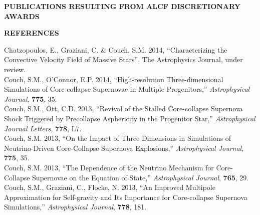 \documentclass[12pt,letterpaper,english]{article}
\begin{document}
\setlength{\parindent}{0in} %


\pagestyle{fancy} \lhead{\doctitle}  \renewcommand{%
\headrulewidth}{0.0pt}

\begin{center}
\bf \large {PUBLICATIONS RESULTING FROM ALCF DISCRETIONARY AWARDS} \\
\end{center}
\vspace{-.25in}
{\noindent \bf \large {REFERENCES
}}

\leftskip 0.25in
 \parindent -0.25in
Chatzopoulos, E., Graziani, C. \& Couch, S.M. 2014, ``Characterizing the Convective Velocity
Field of Massive Stars'', The Astrophysics Journal, under review. \\
 Couch, S.M., O'Connor, E.P. 2014, ``High-resolution Three-dimensional Simulations of Core-collapse Supernovae in Multiple Progenitors,''
  {\it Astrophysical Journal}, {\bf 775}, 35. \\
 Couch, S.M., Ott, C.D. 2013, ``Revival of the Stalled Core-collapse Supernova Shock Triggered by Precollapse Asphericity in the Progenitor Star,''
  {\it Astrophysical Journal Letters}, {\bf 778}, L7. \\
 Couch, S.M. 2013, ``On the Impact of Three Dimensions in
  Simulations of Neutrino-Driven Core-Collapse Supernova Explosions,''
  {\it Astrophysical Journal}, {\bf 775}, 35. \\
 Couch, S.M. 2013, ``The Dependence of the Neutrino
  Mechanism for Core-Collapse Supernovae on the Equation of State,''
  {\it Astrophysical Journal}, {\bf 765}, 29. \\
 Couch, S.M., Graziani, C., Flocke, N. 2013, ``An Improved Multipole Approximation for Self-gravity and Its Importance for Core-collapse Supernova Simulations,''
  {\it Astrophysical Journal}, {\bf 778}, 181. \\
\end{document}
